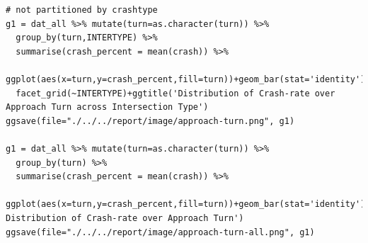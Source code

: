 \documentclass[11pt]{scrartcl} %
\begin{document}
\begin{lstlisting}
# not partitioned by crashtype
g1 = dat_all %>% mutate(turn=as.character(turn)) %>%
  group_by(turn,INTERTYPE) %>%
  summarise(crash_percent = mean(crash)) %>%
  ggplot(aes(x=turn,y=crash_percent,fill=turn))+geom_bar(stat='identity')+
  facet_grid(~INTERTYPE)+ggtitle('Distribution of Crash-rate over Approach Turn across Intersection Type')
ggsave(file="./../../report/image/approach-turn.png", g1)

g1 = dat_all %>% mutate(turn=as.character(turn)) %>%
  group_by(turn) %>%
  summarise(crash_percent = mean(crash)) %>%
  ggplot(aes(x=turn,y=crash_percent,fill=turn))+geom_bar(stat='identity')+ggtitle('Overall Distribution of Crash-rate over Approach Turn')
ggsave(file="./../../report/image/approach-turn-all.png", g1)

\end{lstlisting}
\end{document}
